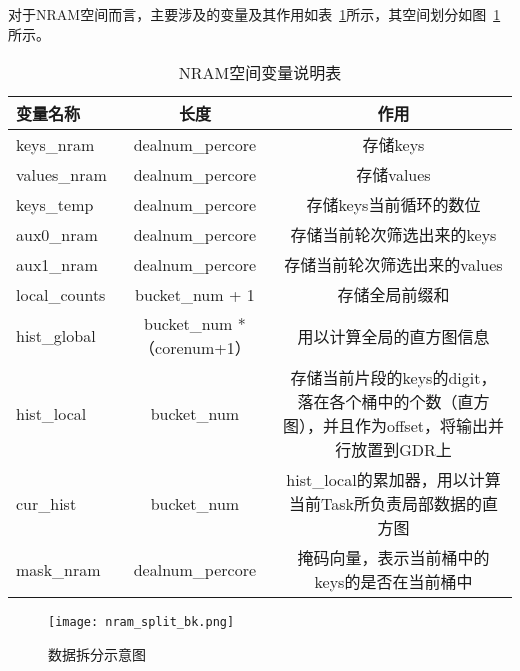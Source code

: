 对于NRAM空间而言，主要涉及的变量及其作用如表~\ref{tab:nram_var_bk}所示，其空间划分如图~\ref{fig:nram_split_bk}所示。
\begin{table}
    \caption{NRAM空间变量说明表}
    \centering
    \begin{tabular}{lcc}
    \toprule
    变量名称 & 长度 & 作用 \\
    \midrule
    keys\_nram & dealnum\_percore & 存储keys \\
    values\_nram & dealnum\_percore & 存储values \\
    keys\_temp & dealnum\_percore & 存储keys当前循环的数位 \\
    aux0\_nram & dealnum\_percore & 存储当前轮次筛选出来的keys \\
    aux1\_nram & dealnum\_percore &  存储当前轮次筛选出来的values\\
    local\_counts & bucket\_num + 1 & 存储全局前缀和 \\
    hist\_global & bucket\_num * （corenum+1） & 用以计算全局的直方图信息 \\
    hist\_local & bucket\_num & \parbox{8cm}{存储当前片段的keys的digit，落在各个桶中的个数（直方图），并且作为offset，将输出并行放置到GDR上} \\
    cur\_hist & bucket\_num & \parbox{8cm}{hist\_local的累加器，用以计算当前Task所负责局部数据的直方图} \\
    mask\_nram & dealnum\_percore & 掩码向量，表示当前桶中的keys的是否在当前桶中 \\
    \bottomrule
    \end{tabular}
    \label{tab:nram_var_bk}
\end{table}

\begin{figure}[ht]
    \centering
    \texttt{[image: nram\_split\_bk.png]}
    \caption{数据拆分示意图}
    \label{fig:nram_split_bk}
\end{figure}




   

